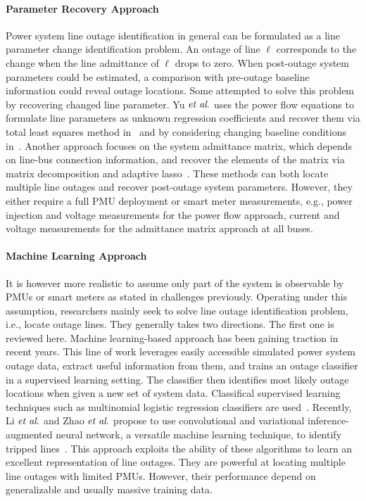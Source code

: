 \paragraph{Parameter Recovery Approach}
Power system line outage identification in general can be formulated as a line parameter change identification problem. An outage of line $\ell$ corresponds to the change when the line admittance of $\ell$ drops to zero. When post-outage system parameters could be estimated, a comparison with pre-outage baseline information could reveal outage locations. Some attempted to solve this problem by recovering changed line parameter. Yu $\textit{et al}.$ uses the power flow equations to formulate line parameters as unknown regression coefficients and recover them via total least squares method in~\cite{Yu2018} and by considering changing baseline conditions in~\cite{Yu2019}. Another approach focuses on the system admittance matrix, which depends on line-bus connection information, and recover the elements of the matrix via matrix decomposition and adaptive lasso~\cite{Babakmehr2016,Ardakanian2019a}. These methods can both locate multiple line outages and recover post-outage system parameters. However, they either require a full PMU deployment or smart meter measurements, e.g., power injection and voltage measurements for the power flow approach, current and voltage measurements for the admittance matrix approach at all buses. 

\paragraph{Machine Learning Approach}
It is however more realistic to assume only part of the system is observable by PMUs or smart meters as stated in challenges previously. Operating under this assumption, researchers mainly seek to solve line outage identification problem, i.e., locate outage lines. They generally takes two directions. The first one is reviewed here. Machine learning-based approach has been gaining traction in recent years. This line of work leverages easily accessible simulated power system outage data, extract useful information from them, and trains an outage classifier in a supervised learning setting. The classifier then identifies most likely outage locations when given a new set of system data. Classifical supervised learning techniques such as multinomial logistic regression classifiers are used~\cite{Garcia2016,Kim2018}. Recently, Li $\textit{et al}.$ and Zhao $\textit{et al}.$ propose to use convolutional and variational inference-augmented neural network, a versatile machine learning technique, to identify tripped lines~\cite{Li2019a,Zhao2020}. This approach exploits the ability of these algorithms to learn an excellent representation of line outages. They are powerful at locating multiple line outages with limited PMUs. However, their performance depend on generalizable and usually massive training data. 

